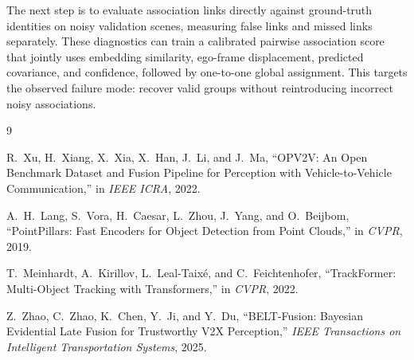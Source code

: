 \documentclass[11pt]{article}
\begin{document}
The next step is to evaluate association links directly against ground-truth
identities on noisy validation scenes, measuring false links and missed links
separately. These diagnostics can train a calibrated pairwise association
score that jointly uses embedding similarity, ego-frame displacement,
predicted covariance, and confidence, followed by one-to-one global
assignment. This targets the observed failure mode: recover valid groups
without reintroducing incorrect noisy associations.

\begin{thebibliography}{9}

R.~Xu, H.~Xiang, X.~Xia, X.~Han, J.~Li, and J.~Ma,
``OPV2V: An Open Benchmark Dataset and Fusion Pipeline for Perception with
Vehicle-to-Vehicle Communication,'' in \emph{IEEE ICRA}, 2022.

A.~H.~Lang, S.~Vora, H.~Caesar, L.~Zhou, J.~Yang, and O.~Beijbom,
``PointPillars: Fast Encoders for Object Detection from Point Clouds,''
in \emph{CVPR}, 2019.

T.~Meinhardt, A.~Kirillov, L.~Leal-Taix\'{e}, and C.~Feichtenhofer,
``TrackFormer: Multi-Object Tracking with Transformers,'' in \emph{CVPR},
2022.

Z.~Zhao, C.~Zhao, K.~Chen, Y.~Ji, and Y.~Du,
``BELT-Fusion: Bayesian Evidential Late Fusion for Trustworthy V2X
Perception,'' \emph{IEEE Transactions on Intelligent Transportation
Systems}, 2025.

\end{thebibliography}
\end{document}
